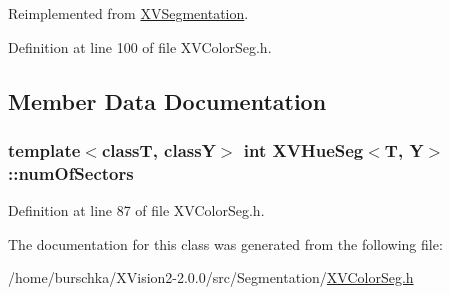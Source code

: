 Reimplemented from \hyperlink{class_XVSegmentation}{XVSegmentation}.

Definition at line 100 of file XVColor\-Seg.h.

\subsection{Member Data Documentation}
\label{XVHueSeg_n0}
\hypertarget{class_XVHueSeg_n0}{
\subsubsection[numOfSectors]{\setlength{\rightskip}{0pt plus 5cm}template$<$classT, classY$>$ int XVHue\-Seg$<$T, Y$>$::num\-Of\-Sectors}}




Definition at line 87 of file XVColor\-Seg.h.

The documentation for this class was generated from the following file:\begin{CompactItemize}
\item 
/home/burschka/XVision2-2.0.0/src/Segmentation/\hyperlink{XVColorSeg.h-source}{XVColor\-Seg.h}\end{CompactItemize}
